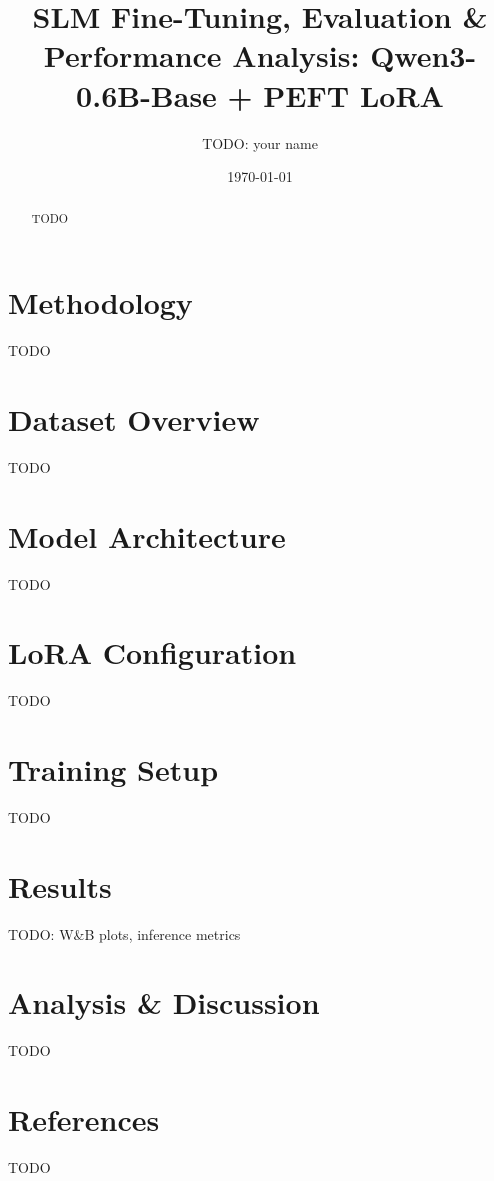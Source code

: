 \documentclass{article}
\title{SLM Fine-Tuning, Evaluation \& Performance Analysis: Qwen3-0.6B-Base + PEFT LoRA}
\author{TODO: your name}
\date{\today}
\begin{document}
\maketitle

\begin{abstract}
TODO
\end{abstract}

\section{Methodology}
TODO

\section{Dataset Overview}
TODO

\section{Model Architecture}
TODO

\section{LoRA Configuration}
TODO

\section{Training Setup}
TODO

\section{Results}
TODO: W\&B plots, inference metrics

\section{Analysis \& Discussion}
TODO

\section{References}
TODO
\end{document}
